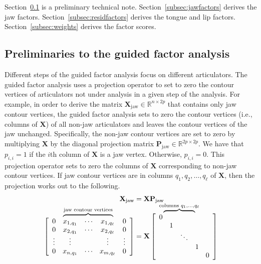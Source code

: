 \documentclass[preprint]{JASAnew}\usepackage[]{graphicx}\usepackage[]{color}
\newcommand\bovermat[2]{%
  \makebox[0pt][l]{$\smash{\overbrace{\phantom{%
    \begin{matrix}#2\end{matrix}}}^{#1}}$}#2}
\begin{document}
Section~\ref{subsec:preliminaries} is a preliminary technical note. Section~\ref{subsec:jawfactors} derives the jaw factors. Section~\ref{subsec:residfactors} derives the tongue and lip factors. Section~\ref{subsec:weights} derives the factor scores. 





\subsection{Preliminaries to the guided factor analysis}
\label{subsec:preliminaries}

Different steps of the guided factor analysis focus on different articulators.
%
The guided factor analysis uses a projection operator to set to zero the contour vertices of articulators not under analysis in a given step of the analysis.
% 
For example, in order to derive the matrix $\mathbf{X}_\text{jaw} \in \mathbb{R}^{n\times 2p}$ that contains only jaw contour vertices, the guided factor analysis sets to zero the contour vertices (i.e., columns of $\mathbf{X}$) of all non-jaw articulators and leaves the contour vertices of the jaw unchanged. 
%
Specifically, the non-jaw contour vertices are set to zero by multiplying $\mathbf{X}$  
% 
by the diagonal projection matrix $\mathbf{P}_\text{jaw} \in \mathbb{R}^{2p\times 2p}$. 
% 
We have that $p_{i,i}=1$ if the $i$th column of $\mathbf{X}$ is a jaw vertex. Otherwise, $p_{i,i}=0$. 
% 
This projection operator sets to zero the columns of $\mathbf{X}$ corresponding to non-jaw contour vertices. 
% 
If jaw contour vertices are in columns $q_1,q_2,\ldots,q_\ell$ of $\mathbf{X}$, then the projection works out to the following. 
% 
\begin{equation}
\begin{split}
  \mathbf{X}_\text{jaw} &= \mathbf{X} \mathbf{P}_\text{jaw} \\[10pt]
%
  \left[ {\begin{array}{ccccc}
   0 & \bovermat{\text{jaw contour vertices}}{x_{1,q_1} &  \cdots & x_{1,q_\ell}} & 0 \\
   0 & x_{2,q_1} &  \cdots & x_{2,q_\ell} & 0 \\
   \vdots & \vdots & & \vdots & \vdots \\
   0 & x_{n,q_1} & \cdots & x_{m,q_\ell} & 0 \\
  \end{array} } \right]
%
  &= 
%
   \mathbf{X}
%
   \left[ {\begin{array}{ccccc}
   \bovermat{\text{columns } q_1,\ldots,q_\ell}{0&&&&}\\
   & 1 &&&\\
   && \ddots &&\\
   &&& 1 &\\
   &&&& 0 \\
  \end{array} } \right]
\end{split}
\end{equation}
\end{document}
